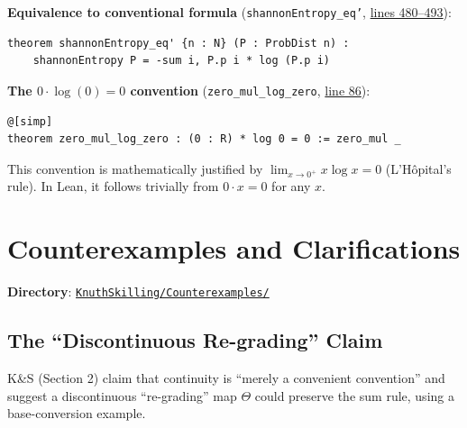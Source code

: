 \documentclass[11pt]{article}
\theoremstyle{definition}
\theoremstyle{remark}
\begin{document}
\textbf{Equivalence to conventional formula} (\texttt{shannonEntropy\_eq'}, \href{https://github.com/zariuq/ks-foundations-of-inference/blob/main/KnuthSkilling/Information/InformationEntropy.lean\#L480-L493}{lines 480--493}):
\begin{lstlisting}[caption={Shannon entropy equals $-\sum p_k \log p_k$},numbers=none]
theorem shannonEntropy_eq' {n : N} (P : ProbDist n) :
    shannonEntropy P = -sum i, P.p i * log (P.p i)
\end{lstlisting}

\textbf{The $0 \cdot \log(0) = 0$ convention} (\texttt{zero\_mul\_log\_zero}, \href{https://github.com/zariuq/ks-foundations-of-inference/blob/main/KnuthSkilling/Information/InformationEntropy.lean\#L86}{line 86}):
\begin{lstlisting}[caption={Convention for entropy at zero probability},numbers=none]
@[simp]
theorem zero_mul_log_zero : (0 : R) * log 0 = 0 := zero_mul _
\end{lstlisting}
This convention is mathematically justified by $\lim_{x \to 0^+} x \log x = 0$ (L'H\^opital's rule). In Lean, it follows trivially from $0 \cdot x = 0$ for any $x$.

\section{Counterexamples and Clarifications}

\textbf{Directory}: \href{https://github.com/zariuq/ks-foundations-of-inference/tree/main/KnuthSkilling/Counterexamples/}{\texttt{KnuthSkilling/Counterexamples/}}

\subsection{The ``Discontinuous Re-grading'' Claim}

K\&S (Section 2) claim that continuity is ``merely a convenient convention'' and suggest
a discontinuous ``re-grading'' map $\Theta$ could preserve the sum rule, using a
base-conversion example.
\end{document}
